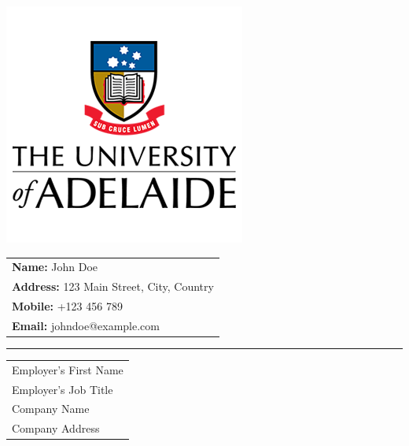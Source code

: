 \documentclass[11pt,a4paper]{article}
\begin{document}
\noindent
\begin{minipage}[c]{0.15\textwidth}
    \includegraphics[width=\textwidth]{uoa_logo.png} %
\end{minipage}%
\begin{minipage}[c]{0.9\textwidth}
    \hspace{1em} %
    \begin{tabular}{@{}l}
        \textbf{Name:} John Doe \\
        \textbf{Address:} 123 Main Street, City, Country \\
        \textbf{Mobile:} +123 456 789 \\
        \textbf{Email:} johndoe@example.com \\
    \end{tabular}
\end{minipage}

\vspace{1ex}
\noindent\color{black}\rule{\textwidth}{1.5pt}

\vspace{1em} %
\noindent
\begin{tabular}{@{}l}
    Employer's First Name \\[1.2ex]
    Employer's Job Title \\[1.2ex]
    Company Name \\[1.2ex]
    Company Address \\[1.2ex]
\end{tabular}
\end{document}
